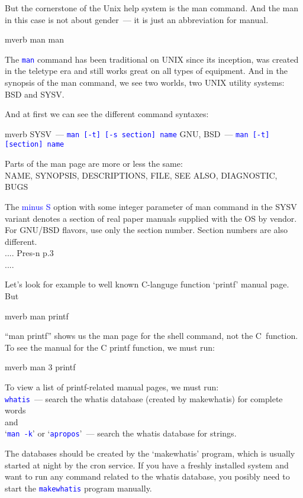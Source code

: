 \documentclass[12pt]{report}
\newcommand{\struct}[1]{\textcolor{blue}{#1}}
\newcommand{\cmd}[1]{\textcolor{blue}{\tt #1}}
\begin{document}
But the cornerstone of the Unix help system is the man command. And the man
in this case is not about gender~--- it is just an abbreviation for manual.
\begin{code}{mverb}
man man
\end{code}
The \cmd{man} command has been traditional on UNIX since its inception,
was created in the teletype era and still works great on all types of equipment.
And in the synopsis of the man command, we see two worlds,
two UNIX utility systems: BSD and SYSV.

And at first we can see the different command syntaxes:
\begin{code}{mverb}
SYSV~--- \cmd{man [-t] [-s section] name}
GNU, BSD~--- \cmd{man [-t] [section] name}
\end{code}

Parts of the man page are more or less the same:\\
NAME, SYNOPSIS, DESCRIPTIONS, FILE, SEE ALSO, DIAGNOSTIC, BUGS

The \struct{minus S} option with some integer parameter of man command
in the SYSV variant denotes a section of real paper manuals supplied with
the OS by vendor. For GNU/BSD flavors, use only the section number.
Section numbers are also different.\\
.... Pres-n p.3\\
....

Let's look for example to well known C-languge function `printf' manual page.
But
\begin{code}{mverb}
man printf
\end{code}
``man printf'' shows us the man page for the shell command, not the C~function.
To see the manual for the C printf function, we must run:
\begin{code}{mverb}
man 3 printf
\end{code}

To view a list of printf-related manual pages, we must run:\\
\cmd{whatis}~--- search the whatis database (created by makewhatis)
for complete words\\
and\\
`\cmd{man -k}' or `\cmd{apropos}'~--- search the whatis database for strings.

The databases should be created by the `makewhatis' program,
which is usually started at night by the cron service. If you have a freshly
installed system and want to run any command related to the whatis database,
you posibly need to start the \cmd{makewhatis} program manually.
\end{document}
